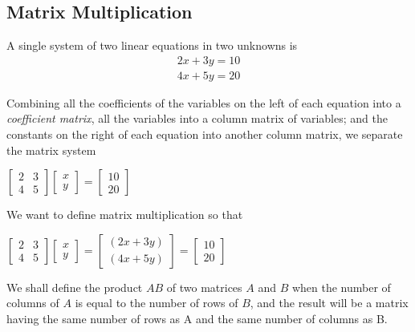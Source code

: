 \documentclass[11pt]{article}
\theoremstyle{definition}
\begin{document}
	\subsection{Matrix Multiplication}
		A single system of two linear equations in two unknowns is 
		\begin{align*}
			2x + 3y = 10 \\
			4x + 5y = 20
		\end{align*}
		
		Combining all the coefficients of the variables on the left of each equation into a \textit{coefficient matrix}, all the variables into a column matrix of variables; and the constants on the right of each equation into another column matrix, we separate the matrix system
		\begin{center}
			$\begin{bmatrix}
			2 & 3 \\ 4 & 5
			\end{bmatrix}
			\begin{bmatrix}
			x \\ y
			\end{bmatrix}
			= \begin{bmatrix}
			10 \\ 20
			\end{bmatrix}$
		\end{center}
		
		We want to define matrix multiplication so that 
		\begin{center}
			$\begin{bmatrix}
			2 & 3 \\ 4 & 5
			\end{bmatrix}
			\begin{bmatrix}
			x \\ y
			\end{bmatrix}
			=\begin{bmatrix}
			(2x + 3y) \\ (4x + 5y)
			\end{bmatrix}
			= \begin{bmatrix}
			10 \\ 20
			\end{bmatrix}$
		\end{center}
	
		We shall define the product $AB$ of two matrices $A$ and $B$ when the number of columns of $A$ is equal to the number of rows of $B$, and the result will be a matrix having the same number of rows as A and the same number of columns as B.
		
\end{document}
